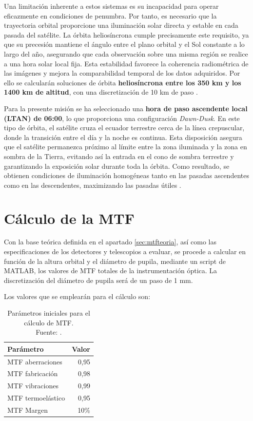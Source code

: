 Una limitación inherente a estos sistemas es su incapacidad para operar eficazmente en condiciones de penumbra. Por tanto, es necesario que la trayectoria orbital proporcione una iluminación solar directa y estable en cada pasada del satélite. La órbita heliosíncrona cumple precisamente este requisito, ya que su precesión mantiene el ángulo entre el plano orbital y el Sol constante a lo largo del año, asegurando que cada observación sobre una misma región se realice a una hora solar local fija. Esta estabilidad favorece la coherencia radiométrica de las imágenes y mejora la comparabilidad temporal de los datos adquiridos. Por ello se calcularán soluciones de órbita \textbf{heliosíncrona entre los 350 km y los 1400 km de altitud}, con una discretización de 10 km de paso \cite{nasa_sso_slots_2011}.

Para la presente misión se ha seleccionado una \textbf{hora de paso ascendente local (LTAN) de 06:00}, lo que proporciona una configuración \textit{Dawn-Dusk}. En este tipo de órbita, el satélite cruza el ecuador terrestre cerca de la línea crepuscular, donde la transición entre el día y la noche es continua. Esta disposición asegura que el satélite permanezca próximo al límite entre la zona iluminada y la zona en sombra de la Tierra, evitando así la entrada en el cono de sombra terrestre y garantizando la exposición solar durante toda la órbita. Como resultado, se obtienen condiciones de iluminación homogéneas tanto en las pasadas ascendentes como en las descendentes, maximizando las pasadas útiles \cite{Boain2004}.

\section{Cálculo de la MTF}

Con la base teórica definida en el apartado \ref{sec:mtfteoria}, así como las especificaciones de los detectores y telescopios a evaluar, se procede a calcular en función de la altura orbital y el diámetro de pupila, mediante un script de MATLAB, los valores de MTF totales de la instrumentación óptica. La discretización del diámetro de pupila será de un paso de 1 mm.

Los valores que se emplearán para el cálculo son:

\begin{table}[H]
\centering
\caption{Parámetros iniciales para el cálculo de MTF. \\ Fuente: \cite{zorita_mtf_2023}.}
\begin{tabular}{l r}
\hline
\textbf{Parámetro} & \textbf{Valor} \\
\hline
MTF aberraciones & 0,95 \\
MTF fabricación & 0,98 \\
MTF vibraciones & 0,99 \\
MTF termoelástico & 0,95 \\
MTF Margen & 10\% \\
\hline
\end{tabular}

\end{table}

